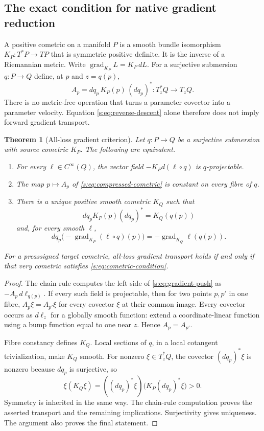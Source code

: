 \documentclass[11pt]{article}
\newtheorem{theorem}{Theorem}[section]
\theoremstyle{definition}
\theoremstyle{remark}\newtheorem{remark}[theorem]{Remark}
\newcommand{\grad}{\operatorname{grad}}
\begin{document}
\subsection{The exact condition for native gradient reduction}
A positive cometric on a manifold $P$ is a smooth bundle isomorphism
$K_P:T^*P\to TP$ that is symmetric positive definite. It is the inverse of a
Riemannian metric. Write $\grad_{K_P}L=K_P\,dL$. For a surjective submersion
$q:P\to Q$ define, at $p$ and $z=q(p)$,
\begin{equation}\label{s:eq:compressed-cometric}
 A_p=dq_p\,K_P(p)\,(dq_p)^*:T_z^*Q\longrightarrow T_zQ.
\end{equation}
There is no metric-free operation that turns a parameter covector into a
parameter velocity. Equation \eqref{s:eq:reverse-descent} alone therefore
does not imply forward gradient transport.

\begin{theorem}[All-loss gradient criterion]\label{s:thm:gradient}
Let $q:P\to Q$ be a surjective submersion with source cometric $K_P$.
The following are equivalent.
\begin{enumerate}[label=(\roman*)]
\item For every $\ell\in C^\infty(Q)$, the vector field
$-K_Pd(\ell\circ q)$ is $q$-projectable.
\item The map $p\mapsto A_p$ of \eqref{s:eq:compressed-cometric} is constant
on every fibre of $q$.
\item There is a unique positive smooth cometric $K_Q$ such that
\begin{equation}\label{s:eq:cometric-condition}
 dq_pK_P(p)(dq_p)^*=K_Q(q(p))
\end{equation}
and, for every smooth $\ell$,
\begin{equation}\label{s:eq:gradient-push}
 dq_p\bigl(-\grad_{K_P}(\ell\circ q)(p)\bigr)
       =-\grad_{K_Q}\ell(q(p)).
\end{equation}
\end{enumerate}
For a preassigned target cometric, all-loss gradient transport holds if and
only if that very cometric satisfies \eqref{s:eq:cometric-condition}.
\end{theorem}
\begin{proof}
The chain rule computes the left side of \eqref{s:eq:gradient-push} as
$-A_p\,d\ell_{q(p)}$. If every such field is projectable, then for two
points $p,p'$ in one fibre, $A_p\xi=A_{p'}\xi$ for every covector $\xi$ at
their common image. Every covector occurs as $d\ell_z$ for a globally smooth
function: extend a coordinate-linear function using a bump function equal
to one near $z$. Hence $A_p=A_{p'}$.

Fibre constancy defines $K_Q$. Local sections of $q$, in a local cotangent
trivialization, make $K_Q$ smooth. For nonzero $\xi\in T_z^*Q$, the
covector $(dq_p)^*\xi$ is nonzero because $dq_p$ is surjective, so
\[
 \xi(K_Q\xi)=((dq_p)^*\xi)\bigl(K_P(dq_p)^*\xi\bigr)>0.
\]
Symmetry is inherited in the same way. The chain-rule computation proves
the asserted transport and the remaining implications. Surjectivity gives
uniqueness. The argument also proves the final statement.
\end{proof}
\end{document}
